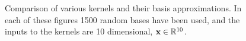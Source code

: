 \documentclass[11pt, oneside]{article}
\begin{document}
\begin{figure}[tbp]
{        \label{fig:matern32}
    }
    \\
    \\
    \caption{Comparison of various kernels and their basis approximations. In
        each of these figures 1500 random bases have been used, and the inputs
        to the kernels are 10 dimensional, $\mathbf{x} \in \mathbb{R}^{10}$.}
    \label{fig:kerns}
\end{figure}
\end{document}

